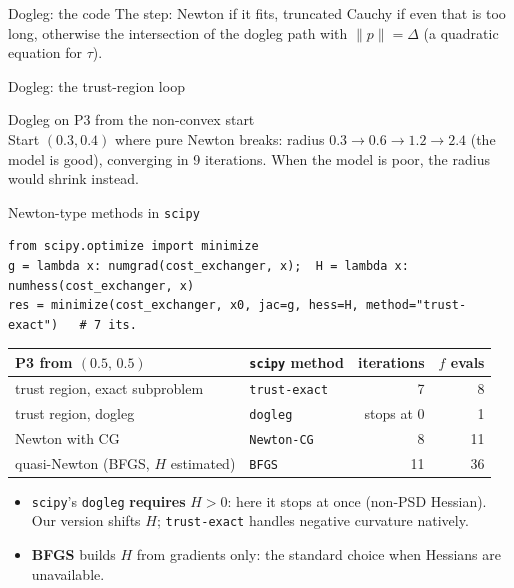 \begin{frame}{Dogleg: the code}
  \small The step: Newton if it fits, truncated Cauchy if even that is too long, otherwise the intersection of the dogleg path with $\|p\|=\Delta$ (a quadratic equation for $\tau$).
\end{frame}

\begin{frame}{Dogleg: the trust-region loop}
\end{frame}

\begin{frame}{Dogleg on P3 from the non-convex start}
  \\[-2pt]
  \small Start $(0.3,0.4)$ where pure Newton breaks: radius $0.3\to0.6\to1.2\to2.4$ (the model is good), converging in 9 iterations. When the model is poor, the radius would shrink instead.
\end{frame}

\begin{frame}[fragile]{Newton-type methods in \texttt{scipy}}
\begin{lstlisting}
from scipy.optimize import minimize
g = lambda x: numgrad(cost_exchanger, x);  H = lambda x: numhess(cost_exchanger, x)
res = minimize(cost_exchanger, x0, jac=g, hess=H, method="trust-exact")   # 7 its.
\end{lstlisting}
  \small
  \begin{center}
  \begin{tabular}{llrr}
    \toprule
    P3 from $(0.5,\,0.5)$ & \texttt{scipy} method & iterations & $f$ evals\\
    \midrule
    trust region, exact subproblem & \texttt{trust-exact} & 7 & 8\\
    trust region, dogleg & \texttt{dogleg} & stops at 0 & 1\\
    Newton with CG & \texttt{Newton-CG} & 8 & 11\\
    quasi-Newton (BFGS, $H$ estimated) & \texttt{BFGS} & 11 & 36\\
    \bottomrule
  \end{tabular}
  \end{center}
  \begin{itemize}
    \item \texttt{scipy}'s \texttt{dogleg} \textbf{requires} $H>0$: here it stops at once (non-PSD Hessian). Our version shifts $H$; \texttt{trust-exact} handles negative curvature natively.
    \item \textbf{BFGS} builds $H$ from gradients only: the standard choice when Hessians are unavailable.
  \end{itemize}
\end{frame}

